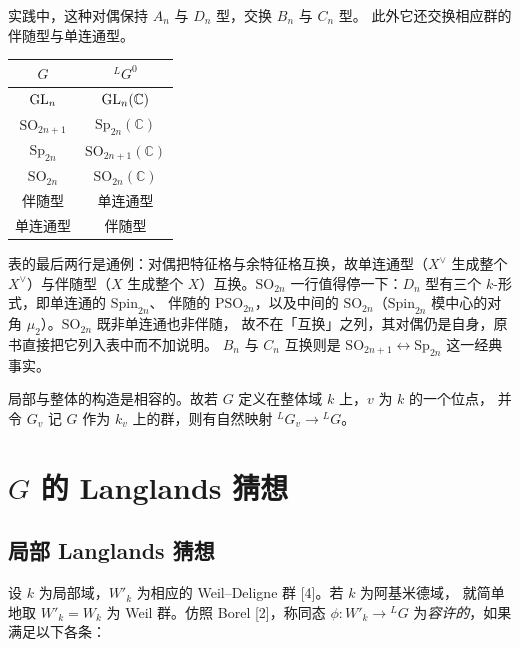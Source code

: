 实践中，这种对偶保持 $A_n$ 与 $D_n$ 型，交换 $B_n$ 与 $C_n$ 型。
此外它还交换相应群的伴随型与单连通型。
\begin{center}
\begin{tabular}{cc}
\hline
$G$ & ${}^{L}G^{0}$ \\
\hline
$\mathrm{GL}_n$ & $\mathrm{GL}_n(\mathbb{C})$ \\
$\mathrm{SO}_{2n+1}$ & $\mathrm{Sp}_{2n}(\mathbb{C})$ \\
$\mathrm{Sp}_{2n}$ & $\mathrm{SO}_{2n+1}(\mathbb{C})$ \\
$\mathrm{SO}_{2n}$ & $\mathrm{SO}_{2n}(\mathbb{C})$ \\
伴随型 & 单连通型 \\
单连通型 & 伴随型 \\
\hline
\end{tabular}
\end{center}
\begin{annote}
表的最后两行是通例：对偶把特征格与余特征格互换，故单连通型（$X^{\vee}$
生成整个 $X^{\vee}$）与伴随型（$X$ 生成整个 $X$）互换。$\mathrm{SO}_{2n}$
一行值得停一下：$D_n$ 型有三个 $k$-形式，即单连通的 $\mathrm{Spin}_{2n}$、
伴随的 $\mathrm{PSO}_{2n}$，以及中间的 $\mathrm{SO}_{2n}$（$\mathrm{Spin}_{2n}$
模中心的对角 $\mu_2$）。$\mathrm{SO}_{2n}$ 既非单连通也非伴随，
故不在「互换」之列，其对偶仍是自身，原书直接把它列入表中而不加说明。
$B_n$ 与 $C_n$ 互换则是 $\mathrm{SO}_{2n+1}\leftrightarrow\mathrm{Sp}_{2n}$
这一经典事实。
\par{}
\end{annote}

局部与整体的构造是相容的。故若 $G$ 定义在整体域 $k$ 上，$v$ 为 $k$ 的一个位点，
并令 $G_v$ 记 $G$ 作为 $k_v$ 上的群，则有自然映射 ${}^{L}G_v\to{}^{L}G$。

\section{\texorpdfstring{$G$}{G} 的 Langlands 猜想}

\subsection{局部 Langlands 猜想}

设 $k$ 为局部域，$W'_k$ 为相应的 Weil--Deligne 群 [4]。若 $k$ 为阿基米德域，
就简单地取 $W'_k=W_k$ 为 Weil 群。仿照 Borel [2]，称同态
$\phi\colon W'_k\to{}^{L}G$ 为\emph{容许的}，如果满足以下各条：

